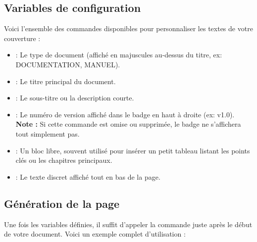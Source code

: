 \subsection{Variables de configuration}

Voici l'ensemble des commandes disponibles pour personnaliser les textes de votre couverture :

\begin{itemize}
    \item {} : Le type de document (affiché en majuscules au-dessus du titre, ex: DOCUMENTATION, MANUEL).
    \item {} : Le titre principal du document.
    \item {} : Le sous-titre ou la description courte.
    \item {} : Le numéro de version affiché dans le badge en haut à droite (ex: v1.0). \textbf{Note :} Si cette commande est omise ou supprimée, le badge ne s'affichera tout simplement pas.
    \item {} : Un bloc libre, souvent utilisé pour insérer un petit tableau listant les points clés ou les chapitres principaux.
    \item {} : Le texte discret affiché tout en bas de la page.
\end{itemize}

\subsection{Génération de la page}

Une fois les variables définies, il suffit d'appeler la commande  juste après le début de votre document. Voici un exemple complet d'utilisation :



